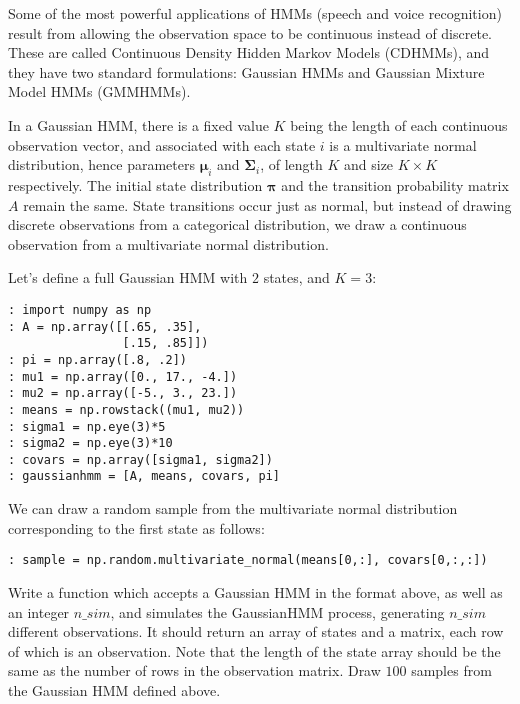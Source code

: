 
Some of the most powerful applications of HMMs (speech and voice recognition) result from allowing the observation space to be continuous instead of discrete.  These are called Continuous Density Hidden Markov Models (CDHMMs), and they have two standard formulations: Gaussian HMMs and Gaussian Mixture Model HMMs (GMMHMMs).

In a Gaussian HMM, there is a fixed value $K$ being the length of each continuous observation vector, and associated with each state $i$ is a multivariate normal distribution, hence parameters $\mathbf{\mu}_{i}$ and $\mathbf{\Sigma}_{i}$, of length $K$ and size $K \times K$ respectively. The initial state distribution $\mathbf{\pi}$ and the transition probability matrix $A$ remain the same. State transitions occur just as normal, but instead of drawing discrete observations from a categorical distribution, we draw a continuous observation from a multivariate normal distribution.

Let's define a full Gaussian HMM with $2$ states, and $K=3$:
\begin{lstlisting}
: import numpy as np
: A = np.array([[.65, .35],
                [.15, .85]])
: pi = np.array([.8, .2])
: mu1 = np.array([0., 17., -4.])
: mu2 = np.array([-5., 3., 23.])
: means = np.rowstack((mu1, mu2))
: sigma1 = np.eye(3)*5
: sigma2 = np.eye(3)*10
: covars = np.array([sigma1, sigma2])
: gaussianhmm = [A, means, covars, pi]
\end{lstlisting}
We can draw a random sample from the multivariate normal distribution corresponding to the first state as follows:

\begin{lstlisting}[style=python]
: sample = np.random.multivariate_normal(means[0,:], covars[0,:,:])
\end{lstlisting}

\begin{problem}
Write a function which accepts a Gaussian HMM in the format above, as well as an integer $n\_sim$, and simulates the GaussianHMM process, generating $n\_sim$ different observations. It should return an array of states and a matrix, each row of which is an observation. Note that the length of the state array should be the same as the number of rows in the observation matrix. Draw $100$ samples from the Gaussian HMM defined above.
\end{problem}

